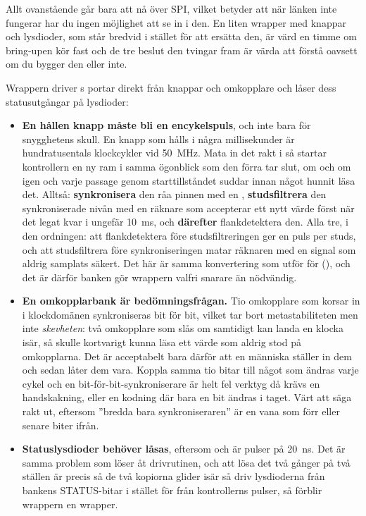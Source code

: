 Allt ovanstående går bara att nå över SPI, vilket betyder att när länken inte fungerar har du ingen
möjlighet att se in i den. En liten wrapper med knappar och lysdioder, som står bredvid
 i stället för att ersätta den, är värd en timme om bring-upen kör fast
\textemdash{} och de tre beslut den tvingar fram är värda att förstå oavsett om du bygger den eller
inte.

Wrappern driver s portar direkt från knappar och omkopplare och låser dess
statusutgångar på lysdioder:


\begin{itemize}
  \item \textbf{En hållen knapp måste bli en encykelspuls}, och inte bara för snygghetens skull. En
    knapp som hålls i några millisekunder är hundratusentals klockcykler vid 50~MHz. Mata in det rakt
    i  så startar kontrollern en ny ram i samma ögonblick som den förra tar slut, om och
    om igen \textemdash{} och varje passage genom starttillståndet suddar  innan något
    hunnit läsa det. Alltså: \textbf{synkronisera} den råa pinnen med en ,
    \textbf{studsfiltrera} den synkroniserade nivån med en räknare som accepterar ett nytt värde
    först när det legat kvar i ungefär 10~ms, och \textbf{därefter} flankdetektera den. Alla tre, i
    den ordningen: att flankdetektera före studsfiltreringen ger en puls per studs, och att
    studsfiltrera före synkroniseringen matar räknaren med en signal som aldrig samplats säkert. Det
    här är samma konvertering som  utför för  (),
    och det är därför banken gör wrappern valfri snarare än nödvändig.
  \item \textbf{En omkopplarbank är bedömningsfrågan.} Tio omkopplare som korsar in i klockdomänen
    synkroniseras bit för bit, vilket tar bort metastabiliteten men inte \emph{skevheten}: två
    omkopplare som slås om samtidigt kan landa en klocka isär, så  skulle kortvarigt
    kunna läsa ett värde som aldrig stod på omkopplarna. Det är acceptabelt bara därför att en
    människa ställer in dem och sedan låter dem vara. Koppla samma tio bitar till något som ändras
    varje cykel och en bit-för-bit-synkroniserare är helt fel verktyg \textemdash{} då krävs en
    handskakning, eller en kodning där bara en bit ändras i taget. Värt att säga rakt ut, eftersom
    ”bredda bara synkroniseraren” är en vana som förr eller senare biter ifrån.
  \item \textbf{Statuslysdioder behöver låsas}, eftersom  och  är pulser
    på 20~ns. Det är samma problem som  löser åt drivrutinen, och att lösa det
    två gånger på två ställen är precis så de två kopiorna glider isär \textemdash{} så driv
    lysdioderna från bankens STATUS-bitar i stället för från kontrollerns pulser, så förblir wrappern
    en wrapper.
\end{itemize}

